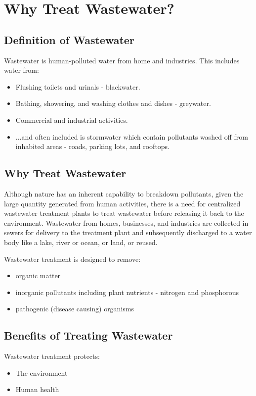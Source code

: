 
\chapter{Why Treat Wastewater?}

\section{Definition of Wastewater}


Wastewater is human-polluted water from home and industries. This includes water from:
\begin{itemize}
\item Flushing toilets and urinals  - blackwater.
\item Bathing, showering, and washing clothes and dishes  - greywater.
\item Commercial and industrial activities.
\item ...and often included is stormwater which contain pollutants washed off from inhabited areas - roads, parking lots, and rooftops.
\end{itemize}

\section{Why Treat Wastewater}
Although nature has an inherent capability to breakdown pollutants, given the large quantity generated from human activities, there is a need for centralized wastewater treatment plants to treat wastewater before releasing it back to the environment.  Wastewater from homes, businesses, and industries are collected in sewers for delivery to the treatment plant and subsequently discharged to a water body like a lake, river or ocean, or land, or reused. 

Wastewater treatment is designed to remove:
\begin{itemize}
\item organic matter
\item inorganic  pollutants including plant nutrients - nitrogen and phosphorous\\
\item pathogenic (disease causing) organisms\\
\end{itemize}

\section{Benefits of Treating Wastewater}
Wastewater treatment protects:
\begin{itemize}
\item The environment
\item Human health
\end{itemize}

